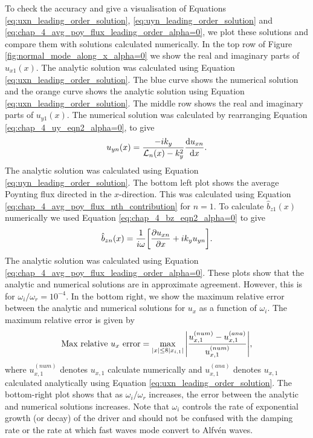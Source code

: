 To check the accuracy and give a visualisation of Equations \eqref{eq:uxn_leading_order_solution}, \eqref{eq:uyn_leading_order_solution} and \eqref{eq:chap_4_avg_poy_flux_leading_order_alpha=0}, we plot these solutions and compare them with solutions calculated numerically. In the top row of Figure \ref{fig:normal_mode_along_x_alpha=0} we show the real and imaginary parts of $u_{x1}(x)$. The analytic solution was calculated using Equation \eqref{eq:uxn_leading_order_solution}. The blue curve shows the numerical solution and the orange curve shows the analytic solution using Equation \eqref{eq:uxn_leading_order_solution}. The middle row shows the real and imaginary parts of $u_{y1}(x)$. The numerical solution was calculated by rearranging Equation \eqref{eq:chap_4_uy_eqn2_alpha=0}, to give
\begin{equation}
    u_{yn}(x)=\frac{-ik_y}{\mathcal{L}_n(x)-k_y^2}\dv{u_{xn}}{x}.
\end{equation}
The analytic solution was calculated using Equation \eqref{eq:uyn_leading_order_solution}.
The bottom left plot shows the average Poynting flux directed in the $x$-direction. This was calculated using Equation \eqref{eq:chap_4_avg_poy_flux_nth_contribution} for $n=1$. To calculate $\hat{b}_{z1}(x)$ numerically we used Equation \eqref{eq:chap_4_bz_eqn2_alpha=0} to give
\begin{equation}
    \hat{b}_{zn}(x)=\frac{1}{i\omega}\qty[\pdv{u_{xn}}{x}+ik_y u_{y n}].
\end{equation}
The analytic solution was calculated using Equation \eqref{eq:chap_4_avg_poy_flux_leading_order_alpha=0}. 
These plots show that the analytic and numerical solutions are in approximate agreement. However, this is for $\omega_i/\omega_r = 10^{-4}$. In the bottom right, we show the maximum relative error between the analytic and numerical solutions for $u_x$ as a function of $\omega_i$. The maximum relative error is given by
\begin{equation}
    \label{eq:chap_4_max_relative_ux_error}
    \text{Max relative $u_x$ error} = \max_{|x|\le 8|x_{i,1}|} \abs{\frac{u_{x,1}^{(num)} - u_{x,1}^{(ana)}}{u_{x,1}^{(num)}}},
\end{equation}
where $u_{x,1}^{(num)}$ denotes $u_{x,1}$ calculate numerically and $u_{x,1}^{(ana)}$ denotes $u_{x,1}$ calculated analytically using Equation \eqref{eq:uxn_leading_order_solution}. The bottom-right plot shows that as $\omega_i/\omega_r$ increases, the error between the analytic and numerical solutions increases. Note that $\omega_i$ controls the rate of exponential growth (or decay) of the driver and should not be confused with the damping rate or the rate at which fast waves mode convert to Alfv\'en waves.

